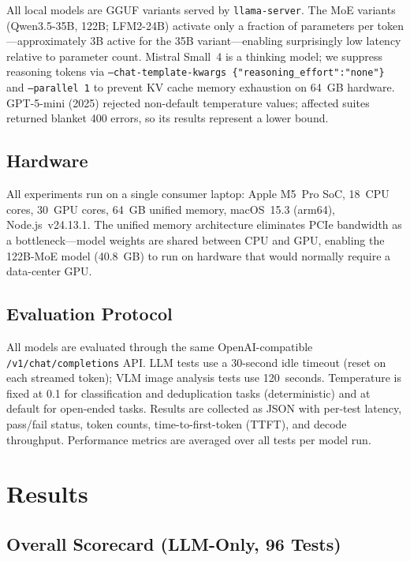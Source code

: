 \documentclass[onecolumn,10pt]{IEEEtran}
\begin{document}
All local models are GGUF variants served by \texttt{llama-server}.
The MoE variants (Qwen3.5-35B, 122B; LFM2-24B) activate only a
fraction of parameters per token---approximately 3B active for the
35B variant---enabling surprisingly low latency relative to parameter
count. Mistral Small~4 is a thinking model; we suppress reasoning
tokens via \texttt{--chat-template-kwargs \{"reasoning\_effort":"none"\}}
and \texttt{--parallel 1} to prevent KV cache memory exhaustion on
64~GB hardware. GPT-5-mini (2025) rejected non-default temperature
values; affected suites returned blanket 400 errors, so its results
represent a lower bound.

\subsection{Hardware}

All experiments run on a single consumer laptop:
Apple M5~Pro SoC, 18~CPU cores, 30~GPU cores, 64~GB unified memory,
macOS~15.3 (arm64), Node.js~v24.13.1. The unified memory architecture
eliminates PCIe bandwidth as a bottleneck---model weights are shared
between CPU and GPU, enabling the 122B-MoE model (40.8~GB) to run on
hardware that would normally require a data-center GPU.

\subsection{Evaluation Protocol}

All models are evaluated through the same OpenAI-compatible
\texttt{/v1/chat/completions} API. LLM tests use a 30-second idle
timeout (reset on each streamed token); VLM image analysis tests
use 120~seconds. Temperature is fixed at 0.1 for classification and
deduplication tasks (deterministic) and at default for open-ended
tasks. Results are collected as JSON with per-test latency, pass/fail
status, token counts, time-to-first-token (TTFT), and decode throughput.
Performance metrics are averaged over all tests per model run.


\section{Results}

\subsection{Overall Scorecard (LLM-Only, 96 Tests)}
\end{document}
